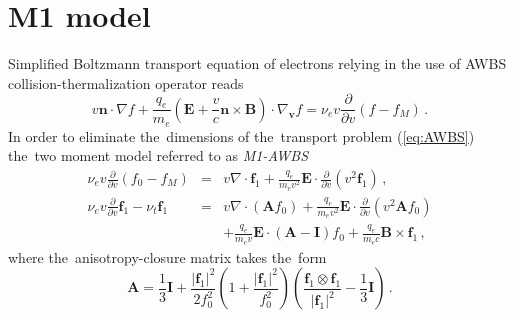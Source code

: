 \documentclass[review]{elsarticle}
\newcommand{\pdv}[2]{\frac{\partial{#1}}{\partial{#2}}}
\newcommand{\vect}[1]{\boldsymbol{#1}}
\newcommand{\matr}[1]{\mathbf{#1}}
\newcommand{\nuee}{\nu_{e}}
\newcommand{\nutot}{\nu_{t}}
\newcommand{\vmag}{v}
\newcommand{\vn}{\vect{n}}
\newcommand{\E}{\vect{E}}
\newcommand{\B}{\vect{B}}
\newcommand{\qe}{q_e}
\newcommand{\me}{m_e}
\newcommand{\fM}{f_M}
\newcommand{\fzero}{f_0}
\newcommand{\fone}{\vect{f}_1}
\newcommand{\MI}{\matr{I}}
\newcommand{\MA}{\matr{A}}
\renewcommand{\refeq}[1]{(\ref{#1})}
\begin{document}
\section{M1 model}\label{sec:m1_model}
Simplified Boltzmann transport equation of electrons relying in the use of AWBS
collision-thermalization operator \cite{AWBS_PRL1986} reads
\begin{equation}
  \vmag\vn\cdot\nabla f + \frac{\qe}{\me}\left( \E + 
  \frac{\vmag}{c}\vn\times\B\right)\cdot\nabla_{\vect{v}} f = \nuee \vmag 
  \pdv{}{\vmag}\left( f - \fM\right)\, .
  \label{eq:AWBS}
\end{equation}
In order to eliminate the~dimensions of the~transport problem \refeq{eq:AWBS}
the~two moment model referred to as \textit{M1-AWBS} 
\begin{eqnarray}
  \nuee\vmag\pdv{}{\vmag}\left(\fzero - \fM \right) &=&
  \vmag\nabla\cdot\fone + \frac{\qe}{\me\vmag^2}\E\cdot\pdv{}{\vmag}
  \left( \vmag^2 \fone\right)\, , 
  \label{eq:M1f0}\\
  \nuee\vmag\pdv{}{\vmag}\fone - \nutot\fone &=& 
  \vmag\nabla\cdot\left(\MA\fzero\right) + 
  \frac{\qe}{\me\vmag^2}\E\cdot\pdv{}{\vmag}
  \left( \vmag^2 \MA\fzero\right) \nonumber\\
  && + \frac{\qe}{\me\vmag}\E\cdot\left( \MA - \MI \right)\fzero +
  \frac{\qe}{\me c}\B\times\fone\, ,
  \label{eq:M1f1}
\end{eqnarray}
where the~anisotropy-closure matrix takes the~form
\begin{equation}
  \MA = \frac{1}{3}\MI + \frac{|\fone|^2}{2\fzero^2}
  \left( 1 + \frac{|\fone|^2}{\fzero^2} \right)
  \left( \frac{\fone\otimes\fone}{|\fone|^2} - \frac{1}{3}\MI\right)\, .
\end{equation}
\end{document}
